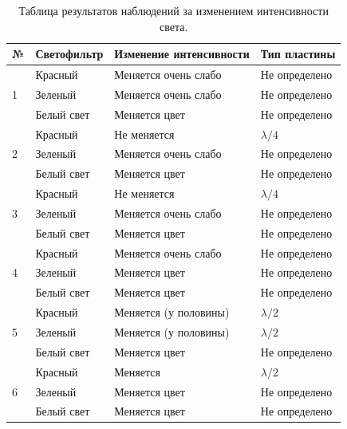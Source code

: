 \documentclass[12pt]{article}
\begin{document}
\begin{table}
\centering
\begin{tabular}{|l|l|l|l|} 
\hline
№                  & Светофильтр   & Изменение
			интенсивности & Тип
			пластины   \\ 
\hline
\multirow{3}{*}{1} & Красный       & Меняется
			очень слабо    & Не
			определено  \\ 
\cline{2-4}
                   & Зеленый       & Меняется
			очень слабо    & Не
			определено  \\ 
\cline{2-4}
                   & Белый
			свет & Меняется
			цвет           & Не
			определено  \\ 
\hline
\multirow{3}{*}{2} & Красный       & Не
			меняется             & $\lambda/4$       \\ 
\cline{2-4}
                   & Зеленый       & Меняется
			очень слабо    & Не
			определено  \\ 
\cline{2-4}
                   & Белый
			свет & Меняется
			цвет           & Не
			определено  \\ 
\hline
\multirow{3}{*}{3} & Красный       & Не
			меняется             & $\lambda/4$       \\ 
\cline{2-4}
                   & Зеленый       & Меняется
			очень слабо    & Не
			определено  \\ 
\cline{2-4}
                   & Белый
			свет & Меняется
			цвет           & Не
			определено  \\ 
\hline
\multirow{3}{*}{4} & Красный       & Меняется
			очень слабо    & Не
			определено  \\ 
\cline{2-4}
                   & Зеленый       & Меняется
			цвет           & Не
			определено  \\ 
\cline{2-4}
                   & Белый
			свет & Меняется
			цвет           & Не
			определено  \\ 
\hline
\multirow{3}{*}{5} & Красный       & Меняется
			(у половины)   & $\lambda/2$       \\ 
\cline{2-4}
                   & Зеленый       & Меняется
			(у половины)   & $\lambda/2$       \\ 
\cline{2-4}
                   & Белый
			свет & Меняется
			цвет           & Не
			определено  \\ 
\hline
\multirow{3}{*}{6} & Красный       & Меняется                   & $\lambda/2$       \\ 
\cline{2-4}
                   & Зеленый       & Меняется
			цвет           & Не
			определено  \\ 
\cline{2-4}
                   & Белый
			свет & Меняется
			цвет           & Не
			определено  \\
\hline
\end{tabular}
\caption{Таблица результатов наблюдений за изменением интенсивности света.}
\label{tab:1}
\end{table}
	
\end{document}
